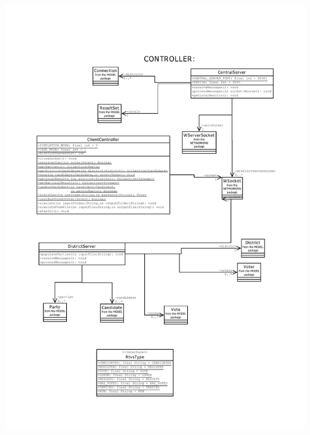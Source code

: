 \documentclass[11pt,english]{article}
\begin{document}
\includegraphics[width=6in]{figures/uml4.pdf} \\ 
\newpage
\end{document}
